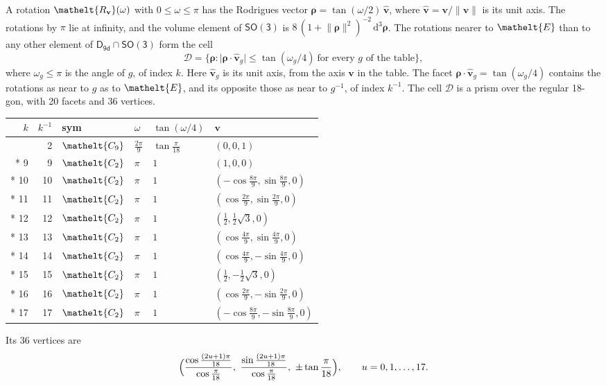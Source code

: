 \documentclass[10pt,a4paper]{article}
\numberwithin{equation}{section}
\newcommand{\eltfont}[1]{{\let\sigma\eltsigma\mathelt{#1}}}
\newcommand{\grp}[1]{\mathsf{#1}}
\newcommand{\cls}[1]{\eltfont{#1}}
\newcommand{\elt}[1]{\eltfont{#1}}
\newcommand{\dirvec}[3]{(#1, #2, #3)}
\newcommand{\unitaxis}{\hat{\mathbf{v}}}
\newcommand{\vv}{\mathbf{v}}
\newcommand{\diff}{\mathrm{d}}
\newcommand{\rodrigues}{\boldsymbol{\rho}}
\newcommand{\fcell}{\mathcal{D}}
\begin{document}
\leavevmode\label{n:vector.rodrigues}\label{n:vector.unitaxis}A rotation $\elt{R_{\vv}}(\omega)$ with $0 \le \omega \le \pi$ has the Rodrigues vector $\rodrigues = \tan(\omega/2)\,\unitaxis$, where $\unitaxis = \vv/\lVert\vv\rVert$ is its unit axis. The rotations by $\pi$ lie at infinity, and the volume element of \href{SO3.pdf}{$\grp{SO(3)}$} is $8\,(1 + \lVert\rodrigues\rVert^2)^{-2}\,\diff^3\rodrigues$.
\leavevmode\label{n:set.cell}The rotations nearer to $\elt{E}$ than to any other element of $\grp{D_{9d}} \cap \grp{SO(3)}$ form the cell
\begin{equation}\label{e:cell}\fcell = \bigl\{\rodrigues : \lvert\rodrigues\cdot\unitaxis_g\rvert \le \tan(\omega_g/4)\ \text{for every $g$ of the table}\bigr\},\end{equation}
where $\omega_g \le \pi$ is the angle of $g$, of index $k$. Here $\unitaxis_g$ is its unit axis, from the axis $\vv$ in the table. The facet $\rodrigues\cdot\unitaxis_g = \tan(\omega_g/4)$ contains the rotations as near to $g$ as to $\elt{E}$, and its opposite those as near to $g^{-1}$, of index $k^{-1}$. The cell $\fcell$ is a prism over the regular 18-gon, with 20 facets and 36 vertices.
{\small{\renewcommand{\arraystretch}{1.3}\begin{longtable}{@{}rrllll@{}}\toprule
$k$ & $k^{-1}$ & sym & $\omega$ & $\tan(\omega/4)$ & $\vv$\\\midrule\endhead
\bottomrule\endfoot\endlastfoot
1 & 2 & $\cls{C_{9}}$ & $\tfrac{2\pi}{9}$ & $\tan\tfrac{\pi}{18}$ & $\dirvec{0}{0}{1}$\\*
9 & 9 & $\cls{C_{2}}$ & $\pi$ & $1$ & $\dirvec{1}{0}{0}$\\*
10 & 10 & $\cls{C_{2}}$ & $\pi$ & $1$ & $\dirvec{-\cos\tfrac{8\pi}{9}}{\sin\tfrac{8\pi}{9}}{0}$\\*
11 & 11 & $\cls{C_{2}}$ & $\pi$ & $1$ & $\dirvec{\cos\tfrac{2\pi}{9}}{\sin\tfrac{2\pi}{9}}{0}$\\*
12 & 12 & $\cls{C_{2}}$ & $\pi$ & $1$ & $\dirvec{\tfrac{1}{2}}{\tfrac{1}{2}\sqrt{3}}{0}$\\*
13 & 13 & $\cls{C_{2}}$ & $\pi$ & $1$ & $\dirvec{\cos\tfrac{4\pi}{9}}{\sin\tfrac{4\pi}{9}}{0}$\\*
14 & 14 & $\cls{C_{2}}$ & $\pi$ & $1$ & $\dirvec{\cos\tfrac{4\pi}{9}}{-\sin\tfrac{4\pi}{9}}{0}$\\*
15 & 15 & $\cls{C_{2}}$ & $\pi$ & $1$ & $\dirvec{\tfrac{1}{2}}{-\tfrac{1}{2}\sqrt{3}}{0}$\\*
16 & 16 & $\cls{C_{2}}$ & $\pi$ & $1$ & $\dirvec{\cos\tfrac{2\pi}{9}}{-\sin\tfrac{2\pi}{9}}{0}$\\*
17 & 17 & $\cls{C_{2}}$ & $\pi$ & $1$ & $\dirvec{-\cos\tfrac{8\pi}{9}}{-\sin\tfrac{8\pi}{9}}{0}$\\
\bottomrule\end{longtable}}}
\leavevmode\label{n:local.vertex.u}Its 36 vertices are
\begin{equation}\label{e:prism}\Bigl(\frac{\cos\frac{(2u+1)\pi}{18}}{\cos\frac{\pi}{18}},\ \frac{\sin\frac{(2u+1)\pi}{18}}{\cos\frac{\pi}{18}},\ \pm\tan\frac{\pi}{18}\Bigr),\qquad u = 0, 1, \dots, 17.\end{equation}
\end{document}

